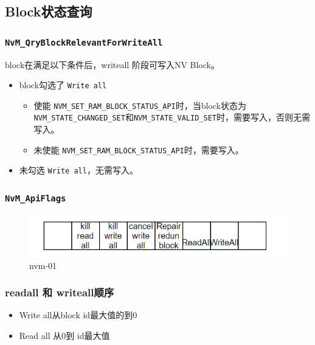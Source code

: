 \subsection{Block状态查询}

\subsubsection{\lstinline{NvM_QryBlockRelevantForWriteAll}}

block在满足以下条件后，writeall 阶段可写入NV Block。

\begin{itemize}
\item
  block勾选了 \lstinline{Write all}

  \begin{itemize}
  \item
    使能
    \lstinline{NVM_SET_RAM_BLOCK_STATUS_API}时，当block状态为\lstinline{NVM_STATE_CHANGED_SET}和\lstinline{NVM_STATE_VALID_SET}时，需要写入，否则无需写入。
  \item
    未使能 \lstinline{NVM_SET_RAM_BLOCK_STATUS_API}时，需要写入。
  \end{itemize}
  
\item
  未勾选 \lstinline{Write all}，无需写入。
\end{itemize}

\subsubsection{\lstinline{NvM_ApiFlags}}

\begin{figure}
\centering
\includegraphics{./pic/NvM_ApiFlags.png}
\caption{nvm-01}
\end{figure}


\subsubsection{readall 和 writeall顺序}

\begin{itemize}
\item
  Write all从block id最大值的到0
\item
  Read all 从0到 id最大值
\end{itemize}

